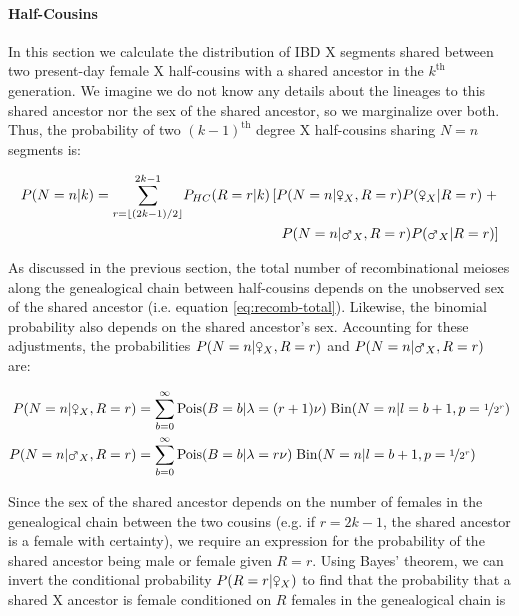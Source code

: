 \documentclass[11pt]{article}
\newcommand{\msxa}{\mars_X}
\newcommand{\fsxa}{\venus_X}
\begin{document}
\paragraph{Half-Cousins}
\label{p:ibd-seg-num-x}

In this section we calculate the distribution of IBD X segments shared between
two present-day female X half-cousins with a shared ancestor in the $k^\text{th}$
generation. We imagine we do not know any details about the lineages to this
shared ancestor nor the sex of the shared ancestor, so we marginalize over
both. Thus, the probability of two $(k-1)^\text{th}$ degree X half-cousins
sharing $N=n$ segments is:

\begin{align}
  \label{eq:prob-n-half-cousins}
  P(N=n | k)  = {\sum_{r=\lfloor (2k-1)/2 \rfloor}^{2k-1}} P_{HC}(R=r | k) \left[  P(N = n | \fsxa, R=r) P(\fsxa | R=r) \; + \right. \nonumber \\
    \left. P(N = n | \msxa, R=r) P(\msxa | R=r) \right]
\end{align}

As discussed in the previous section, the total number of recombinational
meioses along the genealogical chain between half-cousins depends on the
unobserved sex of the shared ancestor (i.e. equation \eqref{eq:recomb-total}).
Likewise, the binomial probability also depends on the shared ancestor's sex.
Accounting for these adjustments, the probabilities $P(N = n | \fsxa, R=r)$ and
$P(N = n | \msxa, R=r)$ are:

\begin{align}
  P(N = n | \fsxa, R=r) &= \sum_{b=0}^\infty  \text{Pois}(B = b | \lambda = (r+1)\nu) \; \text{Bin}(N=n | l = b + 1, p=\nicefrac{1}{2^r}) \label{eq:prob-n-each-female} \\
  P(N = n | \msxa, R=r) &= \sum_{b=0}^\infty  \text{Pois}(B = b | \lambda = r\nu) \; \text{Bin}(N=n | l = b + 1, p=\nicefrac{1}{2^r}) \label{eq:prob-n-each-male} 
\end{align}

Since the sex of the shared ancestor depends on the number of females in the
genealogical chain between the two cousins (e.g. if $r=2k-1$, the shared
ancestor is a female with certainty), we require an expression for the
probability of the shared ancestor being male or female given $R=r$. Using
Bayes' theorem, we can invert the conditional probability $P(R = r | \fsxa)$ to
find that the probability that a shared X ancestor is female conditioned on $R$
females in the genealogical chain is
\end{document}
